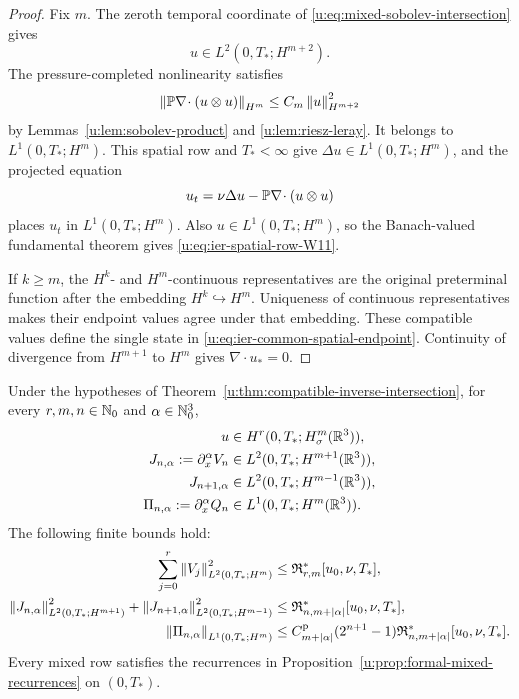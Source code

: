 \begin{proof}
Fix \(m\).  The zeroth temporal coordinate of
\eqref{u:eq:mixed-sobolev-intersection} gives
\[
 u\in L^2(0,T_*;H^{m+2}).
\]
The pressure-completed nonlinearity satisfies
\[
 \left\lVert \mathbb P\nabla\!\cdot(u\otimes u)\right\rVert_{H^m}
 \le C_m\left\lVert u\right\rVert_{H^{m+2}}^2
\]
by Lemmas~\ref{u:lem:sobolev-product} and \ref{u:lem:riesz-leray}.  It belongs
to \(L^1(0,T_*;H^m)\).  This spatial row and \(T_*<\infty\) give
\(\Delta u\in L^1(0,T_*;H^m)\), and the projected equation
\[
 u_t=\nu\Delta u-\mathbb P\nabla\!\cdot(u\otimes u)
\]
places \(u_t\) in \(L^1(0,T_*;H^m)\).  Also
\(u\in L^1(0,T_*;H^m)\), so the Banach-valued fundamental theorem gives
\eqref{u:eq:ier-spatial-row-W11}.

If \(k\ge m\), the \(H^k\)- and \(H^m\)-continuous representatives are
the original preterminal function after the embedding \(H^k\hookrightarrow
H^m\).  Uniqueness of continuous representatives makes their endpoint
values agree under that embedding.  These compatible values define the
single state in \eqref{u:eq:ier-common-spatial-endpoint}.  Continuity of
divergence from \(H^{m+1}\) to \(H^m\) gives \(\nabla\cdot u_*=0\).
\end{proof}

\begin{corollary}
\label{u:cor:ier-whole-terminal-mixed-jet}
Under the hypotheses of Theorem~\ref{u:thm:compatible-inverse-intersection},
for every \(r,m,n\in\mathbb N_0\) and \(\alpha\in\mathbb N_0^3\),
\begin{align}
 u&\in H^r(0,T_*;H^m_\sigma(\mathbb R^3)),
 \label{u:eq:ier-whole-terminal-bochner}\\
 J_{n,\alpha}:=\partial_x^\alpha V_n
 &\in L^2(0,T_*;H^{m+1}(\mathbb R^3)),
 \label{u:eq:ier-whole-terminal-mixed-upper}\\
 J_{n+1,\alpha}
 &\in L^2(0,T_*;H^{m-1}(\mathbb R^3)),
 \label{u:eq:ier-whole-terminal-mixed-lower}\\
 \Pi_{n,\alpha}:=\partial_x^\alpha Q_n
 &\in L^1(0,T_*;H^m(\mathbb R^3)).
 \label{u:eq:ier-whole-terminal-mixed-pressure}
\end{align}
The following finite bounds hold:
\begin{align}
 \sum_{j=0}^{r}\left\lVert V_j\right\rVert_{L^2(0,T_*;H^m)}^2
 &\le\mathfrak R_{r,m}^*[u_0,\nu,T_*],
 \label{u:eq:ier-finite-bochner-bound}\\
 \left\lVert J_{n,\alpha}\right\rVert_{L^2(0,T_*;H^{m+1})}^2
 +\left\lVert J_{n+1,\alpha}\right\rVert_{L^2(0,T_*;H^{m-1})}^2
 &\le\mathfrak R_{n,m+|\alpha|}^*[u_0,\nu,T_*],
 \label{u:eq:ier-finite-mixed-bound}\\
 \left\lVert \Pi_{n,\alpha}\right\rVert_{L^1(0,T_*;H^m)}
 &\le C_{m+|\alpha|}^{\rm p}(2^{n+1}-1)
 \mathfrak R_{n,m+|\alpha|}^*[u_0,\nu,T_*].
 \label{u:eq:ier-finite-mixed-pressure-bound}
\end{align}
Every mixed row satisfies the recurrences in
Proposition~\ref{u:prop:formal-mixed-recurrences} on \((0,T_*)\).
\end{corollary}

